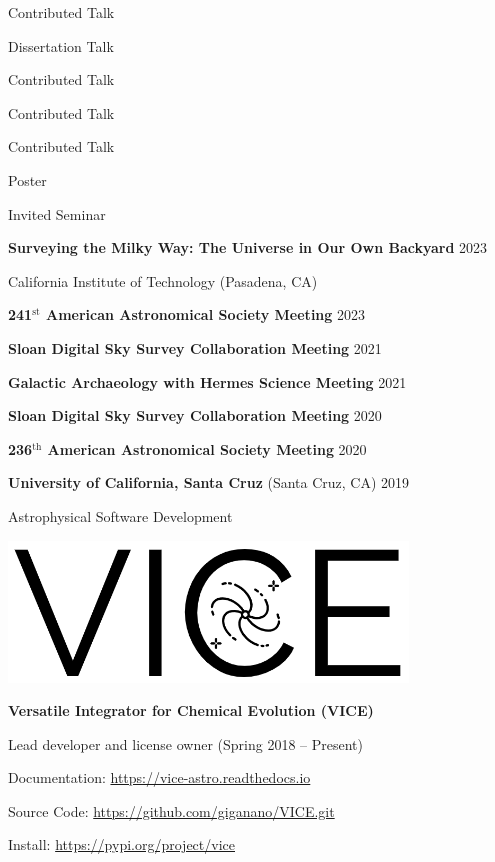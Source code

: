 \documentclass[cv.tex]{subfiles}
\begin{document}
\newpage
\noindent
\parbox{0.18\textwidth}{%
	\raggedleft
	Contributed Talk \par
	\null \par
	Dissertation Talk \par
	Contributed Talk \par
	Contributed Talk \par
	Contributed Talk \par
	Poster \par
	Invited Seminar \par
}
\hspace{1mm}
\parbox{0.8\textwidth}{%
	\vspace{1mm}
	\textbf{Surveying the Milky Way: The Universe in Our Own Backyard}
	\hfill 2023 \par
	California Institute of Technology (Pasadena, CA) \par
	\textbf{241$^\text{st}$ American Astronomical Society Meeting}
	\hfill 2023 \par
	\textbf{Sloan Digital Sky Survey Collaboration Meeting}
	\hfill 2021 \par
	\textbf{Galactic Archaeology with Hermes Science Meeting}
	\hfill 2021 \par
	\textbf{Sloan Digital Sky Survey Collaboration Meeting}
	\hfill 2020 \par
	\textbf{236$^\text{th}$ American Astronomical Society Meeting}
	\hfill 2020 \par
	\textbf{University of California, Santa Cruz} (Santa Cruz, CA) \hfill 2019
	\par
}



\vspace{4mm}
\noindent
{%
{\color{themecolor} \large Astrophysical Software Development}
\par\noindent
\parbox{0.35\textwidth}{%
	\centering
	\includegraphics[scale = 0.33]{vice-logo.png}
}
\parbox{0.63\textwidth}{%
	\textbf{Versatile Integrator for Chemical Evolution (VICE)} \par
	Lead developer and license owner (Spring 2018 -- Present) \par
	Documentation: \url{https://vice-astro.readthedocs.io} \par
	Source Code: \url{https://github.com/giganano/VICE.git} \par
	Install: \url{https://pypi.org/project/vice}
}
}
\end{document}

